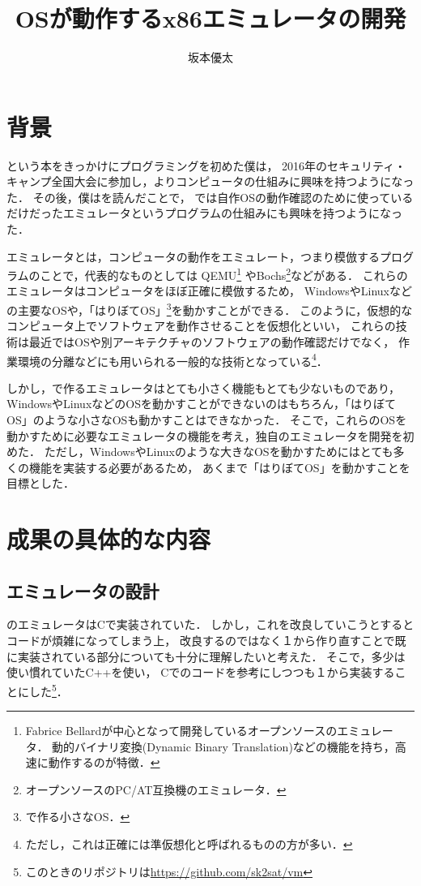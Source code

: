 \documentclass[10pt,a4j]{jsarticle}
\title{\vspace{-13mm}OSが動作するx86エミュレータの開発}
\author{\vspace{-3mm}坂本優太}
\date{}
\begin{document}
\maketitle
\vspace{-12mm}

\section{\vspace{-2mm}背景}
\cite[30日でできる！ OS自作入門]{30days-osdev}という本をきっかけにプログラミングを初めた僕は，
2016年のセキュリティ・キャンプ全国大会に参加し，よりコンピュータの仕組みに興味を持つようになった．
その後，僕は\cite[自作エミュレータで学ぶx86アーキテクチャ]{learn-x86-by-emu}を読んだことで，
\cite{30days-osdev}では自作OSの動作確認のために使っているだけだったエミュレータというプログラムの仕組みにも興味を持つようになった．

エミュレータとは，コンピュータの動作をエミュレート，つまり模倣するプログラムのことで，代表的なものとしては
QEMU\footnote{Fabrice Bellardが中心となって開発しているオープンソースのエミュレータ．
動的バイナリ変換(Dynamic Binary Translation)などの機能を持ち，高速に動作するのが特徴．}
やBochs\footnote{オープンソースのPC/AT互換機のエミュレータ．}などがある．
これらのエミュレータはコンピュータをほぼ正確に模倣するため，
WindowsやLinuxなどの主要なOSや，「はりぼてOS」\footnote{\cite{30days-osdev}で作る小さなOS．}を動かすことができる．
このように，仮想的なコンピュータ上でソフトウェアを動作させることを仮想化といい，
これらの技術は最近ではOSや別アーキテクチャのソフトウェアの動作確認だけでなく，
作業環境の分離などにも用いられる一般的な技術となっている\footnote{ただし，これは正確には準仮想化と呼ばれるものの方が多い．}．

しかし，\cite{learn-x86-by-emu}で作るエミュレータはとても小さく機能もとても少ないものであり，
WindowsやLinuxなどのOSを動かすことができないのはもちろん，「はりぼてOS」のような小さなOSも動かすことはできなかった．
そこで，これらのOSを動かすために必要なエミュレータの機能を考え，独自のエミュレータを開発を初めた．
ただし，WindowsやLinuxのような大きなOSを動かすためにはとても多くの機能を実装する必要があるため，
あくまで「はりぼてOS」を動かすことを目標とした．
\vspace{-3mm}
\section{成果の具体的な内容}
\subsection{エミュレータの設計}
\vspace{-2mm}
\cite{learn-x86-by-emu}のエミュレータはCで実装されていた．
しかし，これを改良していこうとするとコードが煩雑になってしまう上，
改良するのではなく１から作り直すことで既に実装されている部分についても十分に理解したいと考えた．
そこで，多少は使い慣れていたC++を使い，
Cでのコードを参考にしつつも１から実装することにした\footnote{このときのリポジトリは\url{https://github.com/sk2sat/vm}}．
\end{document}
